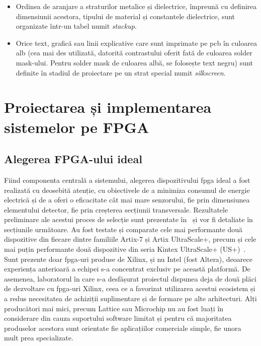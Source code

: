 \documentclass[12pt,a4paper]{report}
\begin{document}
\begin{itemize}
\item Ordinea de aranjare a straturilor metalice și dielectrice, împreună cu definirea dimensiunii acestora, tipului de material și constantele dielectrice, sunt organizate într-un tabel numit \textit{stackup}.
\item Orice text, grafică sau linii explicative care sunt imprimate pe \gls{pcb} în culoarea alb (cea mai des utilizată, datorită contrastului oferit fată de culoarea solder mask-ului. Pentru solder mask de culoarea albă, se folosește text negru)  sunt definite în stadiul de proiectare pe un strat special numit \textit{silkscreen}.
\end{itemize}


\chapter{Proiectarea și implementarea sistemelor pe FPGA}
\section{Alegerea FPGA-ului ideal}
Fiind componenta centrală a sistemului, alegerea dispozitivului \gls{fpga} ideal a fost realizată cu deosebită atenție, cu obiectivele de a minimiza consumul de energie electrică și de a oferi o eficacitate cât mai mare senzorului, fie prin dimensiunea elementului detector, fie prin creșterea secțiunii transversale. Rezultatele preliminare ale acestui proces de selecție sunt prezentate în~\cite{jes} și vor fi detaliate în secțiunile următoare. Au fost testate și comparate cele mai performante două dispozitive din fiecare dintre familiile Artix-7 și Artix UltraScale+, precum și cele mai puțin performante două dispozitive din seria Kintex UltraScale+ (US+)~\cite{7series_product_selection, ultrascale_product_selection}. Sunt prezente doar \gls{fpga}-uri produse de Xilinx, și nu Intel (fost Altera), deoarece experiența anterioară a echipei s-a concentrat exclusiv pe această platformă. De asemenea, laboratorul în care s-a desfășurat proiectul dispunea deja de două plăci de dezvoltare cu \gls{fpga}-uri Xilinx, ceea ce a favorizat utilizarea acestui ecosistem și a redus necesitatea de achiziții suplimentare și de formare pe alte arhitecturi. Alți producători mai mici, precum Lattice sau Microchip nu au fost luați în considerare din cauza suportului software limitat și pentru că majoritatea produselor acestora sunt orientate fie aplicațiilor comerciale simple, fie unora mult prea specializate.
\end{document}
